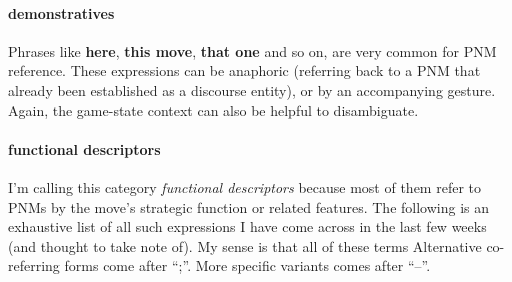 \documentclass{scrartcl}
\begin{document}
\paragraph{demonstratives}

Phrases like \textbf{here}, \textbf{this move}, \textbf{that one}
and so on, are very common for PNM reference. 
These expressions can be anaphoric 
(referring back to a PNM that already been established as a discourse entity),
or by an accompanying gesture. 
Again, the game-state context can also be helpful to disambiguate.

\paragraph{functional descriptors}

I'm calling this category \emph{functional descriptors} because most of 
them refer to PNMs by the move's strategic function or related features.
The following is an exhaustive list of all such expressions I have come
across in the last few weeks (and thought to take note of).
My sense is that all of these terms 
Alternative co-referring forms come after ``;''. 
More specific variants comes after ``--''.
\end{document}
